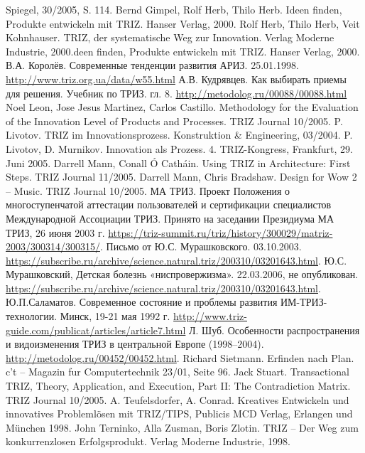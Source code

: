\begin{thebibliography}{xxx}
  Spiegel, 30/2005, S. 114.
 Bernd Gimpel, Rolf Herb, Thilo Herb. Ideen finden,
  Produkte entwickeln mit TRIZ. Hanser Verlag, 2000.
 Rolf Herb, Thilo Herb, Veit Kohnhauser. TRIZ, der
  systematische Weg zur Innovation. Verlag Moderne Industrie, 2000.deen finden,
  Produkte entwickeln mit TRIZ. Hanser Verlag, 2000.
 В.А. Королёв. Современные тенденции развития АРИЗ.
  25.01.1998. \url{http://www.triz.org.ua/data/w55.html}
 А.В. Кудрявцев. Как выбирать приемы для решения.
  Учебник по ТРИЗ. гл. 8.  \url{http://metodolog.ru/00088/00088.html}
 Noel Leon, Jose Jesus Martinez, Carlos Castillo.
  Methodology for the Evaluation of the Innovation Level of Products and
  Processes. TRIZ Journal 10/2005.
 P. Livotov. TRIZ im Innovationsprozess. Konstruktion \&
  Engineering, 03/2004.
 P. Livotov, D. Murnikov. Innovation als Prozess. 
  4. TRIZ-Kongress, Frankfurt, 29. Juni 2005. 
 Darrell Mann, Conall Ó Catháin.  Using TRIZ in
  Architecture: First Steps. TRIZ Journal 11/2005.
 Darrell Mann, Chris Bradshaw. Design for Wow 2 – Music.
  TRIZ Journal 10/2005.
 МА ТРИЗ. Проект Положения о многоступенчатой аттестации
  пользователей и сертификации специалистов Международной Ассоциации ТРИЗ.
  Принято на заседании Президиума МА ТРИЗ, 26 июня 2003 г.
  \url{https://triz-summit.ru/triz/history/300029/matriz-2003/300314/300315/}.
 Письмо от Ю.С. Мурашковского. 03.10.2003.
  \url{https://subscribe.ru/archive/science.natural.triz/200310/03201643.html}.
 Ю.С. Мурашковский, Детская болезнь
  «ниспровержизма». 22.03.2006, не опубликован.
  \url{https://subscribe.ru/archive/science.natural.triz/200310/03201643.html}.
 Ю.П.Саламатов. Современное состояние и проблемы
  развития ИМ-ТРИЗ-технологии. Минск, 19-21 мая 1992 г.
  \url{http://www.triz-guide.com/publicat/articles/article7.html}
 Л. Шуб. Особенности распространения и видоизменения ТРИЗ в
  центральной Европе (1998--2004).
  \url{http://metodolog.ru/00452/00452.html}.
 Richard Sietmann. Erfinden nach Plan. c't -- Magazin
  fur Computertechnik 23/01, Seite 96.
 Jack Stuart. Transactional TRIZ, Theory, Application, and
  Execution, Part II: The Contradiction Matrix. TRIZ Journal 10/2005.
 A. Teufelsdorfer, A.  Conrad. Kreatives Entwickeln
  und innovatives Problemlösen mit TRIZ/TIPS, Publicis MCD Verlag, Erlangen
  und München 1998.
 John Terninko, Alla Zusman, Boris Zlotin. TRIZ -- Der
  Weg zum konkurrenzlosen Erfolgsprodukt. Verlag Moderne Industrie, 1998.
\end{thebibliography}

